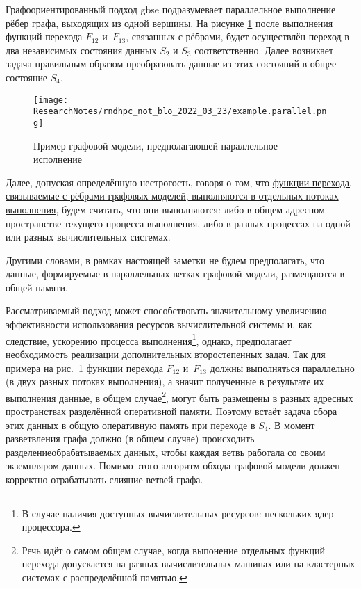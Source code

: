 \def\notedate{2022.03.23}
\def\currentauthor{Тришин~И.В., Соколов~А.П.}

Графоориентированный подход \gls{gbse} подразумевает параллельное выполнение рёбер графа, выходящих из одной вершины. На рисунке \ref{fig:parallelExample} после выполнения функций перехода $F_{12}$ и~$F_{13}$, связанных с рёбрами, будет осуществлён переход в два независимых состояния данных $S_2$ и $S_3$ соответственно. Далее возникает задача правильным образом преобразовать данные из этих состояний в общее состояние $S_4$.

\begin{figure}[!ht]
    \centering
    \texttt{[image: ResearchNotes/rndhpc\_not\_blo\_2022\_03\_23/example.parallel.png]}
    \caption{Пример графовой модели, предполагающей параллельное исполнение}
    \label{fig:parallelExample}
\end{figure}

\begin{remark}
Далее, допуская определённую нестрогость, говоря о том, что \uline{функции перехода, связываемые с рёбрами графовых моделей, выполняются в отдельных потоках выполнения}, будем считать, что они выполняются: либо в общем адресном пространстве текущего процесса выполнения, либо в разных процессах на одной или разных вычислительных системах. 

Другими словами, в рамках настоящей заметки не будем предполагать, что данные, формируемые в параллельных ветках графовой модели, размещаются в общей памяти.
\end{remark}

Рассматриваемый подход может способствовать значительному увеличению эффективности использования ресурсов вычислительной системы и, как следствие, ускорению процесса выполнения\footnote{В случае наличия доступных вычислительных ресурсов: нескольких ядер процессора.}, однако, предполагает необходимость реализации дополнительных второстепенных задач. Так для примера на рис.~\ref{fig:parallelExample} функции перехода $F_{12}$ и~$F_{13}$ должны выполняться параллельно (в двух разных потоках выполнения), а значит полученные в результате их выполнения данные, в общем случае\footnote{Речь идёт о самом общем случае, когда выпонение отдельных функций перехода допускается на разных вычислительных машинах или на кластерных системах с распределённой памятью.}, могут быть размещены в разных адресных пространствах разделённой оперативной памяти. Поэтому встаёт задача сбора этих данных в общую оперативную память при переходе в $S_4$. В момент разветвления графа должно (в общем случае) происходить \flqq разделение\frqq обрабатываемых данных, чтобы каждая ветвь работала со своим экземпляром данных. Помимо этого алгоритм обхода графовой модели должен корректно отрабатывать слияние ветвей графа.

